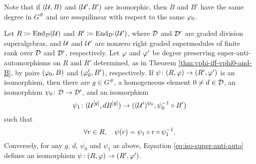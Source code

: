 Note that if $(\mathcal U, B)$ and $(\mathcal U', B')$ are isomorphic, then $B$ and $B'$ have the same degree in $G^\#$ and are sesquilinear with respect to the same $\varphi_0$.


\begin{thm}\label{thm:iso-abstract-vphi}
	Let $R \coloneqq \operatorname{End}_{\mathcal{D}}(\mathcal U)$ and $R' \coloneqq \operatorname{End}_{\mathcal{D}'}(\mathcal U')$, where $\mathcal{D}$ and $\mathcal{D}'$ are graded division superalgebras, and $\mathcal U$ and $\mathcal U'$ are nonzero right graded supermodules of finite rank over $\mathcal{D}$ and $\mathcal{D}'$, respectively.
	Let $\varphi$ and $\varphi'$ be degree preserving super-anti-automorphisms on $R$ and $R'$ determined, as in Theorem \ref{thm:vphi-iff-vphi0-and-B}, by pairs $(\varphi_0, B)$ and $(\varphi_0', B')$, respectively.
	If $\psi\colon (R, \varphi) \to (R', \varphi')$ is an isomorphism, then there are $g\in G^\#$, a homogeneous element $0\neq d\in \mathcal{D}$, an isomorphism $\psi_0\colon \mathcal{D} \to \mathcal{D}'$, and an isomorphism
	\begin{equation}\label{eq:iso-B-implies-vphi}
		\psi_1 \colon (\mathcal U^{[g]}, dB^{[g]}) \to ( (\mathcal U')^{\psi_0}, \psi_0^{-1} \circ B' )
	\end{equation}
	such that
	\begin{equation}\label{eq:iso-super-anti-auto}
		\forall r\in R, \quad \psi(r) = \psi_1 \circ r \circ \psi_1^{-1}.
	\end{equation}
	Conversely, for any $g$, $d$, $\psi_0$ and $\psi_1$ as above,
	Equation \eqref{eq:iso-super-anti-auto}
	defines an isomorphism $\psi \colon (R, \varphi) \to (R', \varphi')$.
\end{thm}

